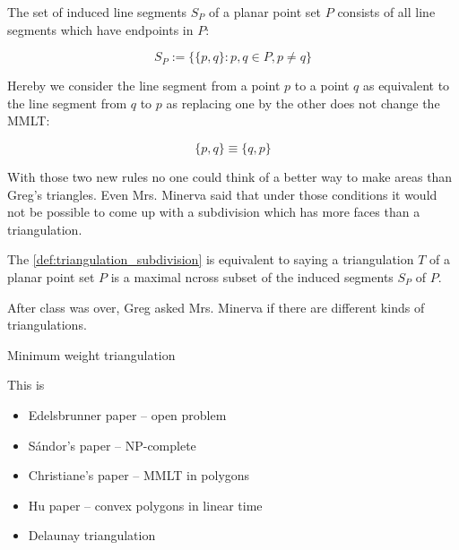 \begin{definition}\label{def:induced_segments}
The set of induced line segments \(S_P\) of a planar point set \(P\)
consists of all line segments which have endpoints in \(P\):

\[ S_P := \{\{p,q\} : p,q\in P, p\neq q\} \]

Hereby we consider the line segment from a point \(p\) to a point
\(q\) as equivalent to the line segment from \(q\) to \(p\) as 
replacing one by the other does not change the \gls{MMLT}:

\[ \{p, q\} \equiv \{q, p\} \]
\end{definition}

With those two new rules no one could think of a better way to make
areas than Greg's triangles. Even Mrs. Minerva said that under those
conditions it would not be possible to come up with a subdivision
which has more faces than a triangulation.

\begin{definition}[Triangulation]\label{def:triangulation}
The \cref{def:triangulation_subdivision} is equivalent to saying
a triangulation \(T\) of a planar point set \(P\) is a maximal
\gls{ncross} subset of the induced segments \(S_P\) of \(P\).
\end{definition}

After class was over, Greg asked Mrs. Minerva if there are different
kinds of triangulations. 

Minimum weight triangulation \cite{mwt_complexity}

 This is 


\begin{itemize}
  \item Edelsbrunner paper -- open problem \cite{mmlt_problem}
  \item Sándor's paper --  NP-complete \cite{mmlt_complexity}
  \item Christiane's paper -- MMLT in polygons \cite{mmlt_polygons}
  \item Hu paper -- convex polygons in linear time \cite{mmlt_convex_polygons}
  \item Delaunay triangulation
\end{itemize}
